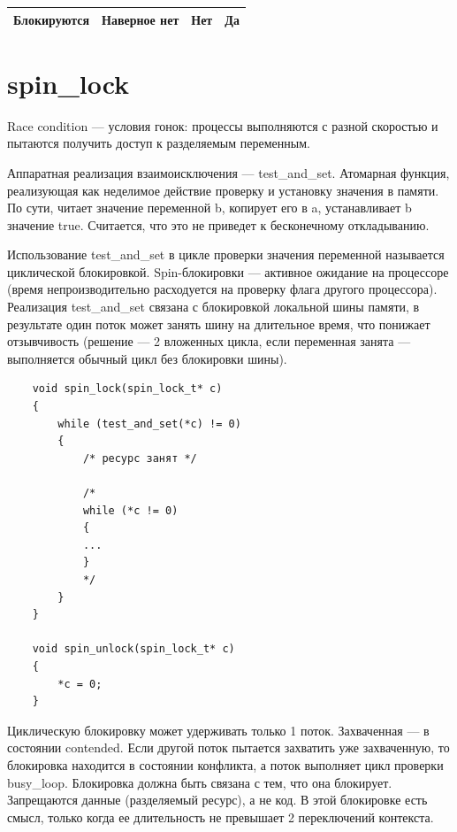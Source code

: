 \begin{table}[H]
\begin{center}
\begin{tabular}{|c|l|l|l|}
Блокируются                                                         & Наверное нет                                                                                        & Нет                                                                                             & Да                                                                                       \\ \hline
\end{tabular}
\end{center}
\end{table}

\section{spin\_lock}

Race condition --- условия гонок: процессы выполняются с разной скоростью и пытаются получить доступ к разделяемым переменным. 

Аппаратная реализация взаимоисключения --- test\_and\_set. Атомарная функция, реализующая как неделимое действие проверку и установку значения в памяти. По сути, читает значение переменной b, копирует его в a, устанавливает b значение true. Считается, что это не приведет к бесконечному откладыванию. 

Использование test\_and\_set в цикле проверки значения переменной называется циклической блокировкой. Spin-блокировки --- активное ожидание на процессоре (время непроизводительно расходуется на проверку флага другого процессора). Реализация test\_and\_set связана с блокировкой локальной шины памяти, в результате один поток может занять шину на длительное время, что понижает отзывчивость (решение --- 2 вложенных цикла, если переменная занята --- выполняется обычный цикл без блокировки шины).

\begin{lstlisting}
	void spin_lock(spin_lock_t* c)
	{
		while (test_and_set(*c) != 0)
		{
			/* ресурс занят */
			
			/*
			while (*c != 0) 
			{
			...
			}
			*/
		}
	}
	
	void spin_unlock(spin_lock_t* c)
	{
		*c = 0;
	}
\end{lstlisting}

Циклическую блокировку может удерживать только 1 поток. Захваченная --- в состоянии contended. Если другой поток пытается захватить уже захваченную, то блокировка находится в состоянии конфликта, а поток выполняет цикл проверки busy\_loop. Блокировка должна быть связана с тем, что она блокирует. Запрещаются данные (разделяемый ресурс), а не код. В этой блокировке есть смысл, только когда ее длительность не превышает 2 переключений контекста.

